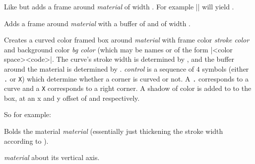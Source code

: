 Like \gotomacro{} but adds a frame around {\it material} of width \macro\framewidth.
For example \inlinecode|| will yield .
\emacroexp

Adds a frame around {\it material} with a buffer of \macro\bufferwidth{} and \macro\bufferheight{} of width \macro\framewidth.
\emacroexp

Creates a curved color framed box around {\it material} with frame color {\it stroke color} and background color {\it bg color} (which may be names or of the form \inlinecode|<color space>{<code>}|.
The curve's stroke width is determined by \macro\curvewidth, and the buffer around the material is determined by \macro\curvebuffer.
{\it control} is a sequence of $4$ symbols (either {\tt .} or {\tt X}) which determine whether a corner is curved or not.
A {\tt .} corresponds to a curve and a {\tt X} corresponds to a right corner.
A shadow of color \macro\boxshadowcolor{} is added to to the box, at an x and y offset of \macro\shadowxoff{} and \macro\shadowyoff{} respectively.

So for example:

\emacroexp

Bolds the material {\it material} (essentially just thickening the stroke width according to \macro\fakeboldwidth).
\emacroexp

\quitvmode{} {\it material} about its vertical axis.
\emacroexp

